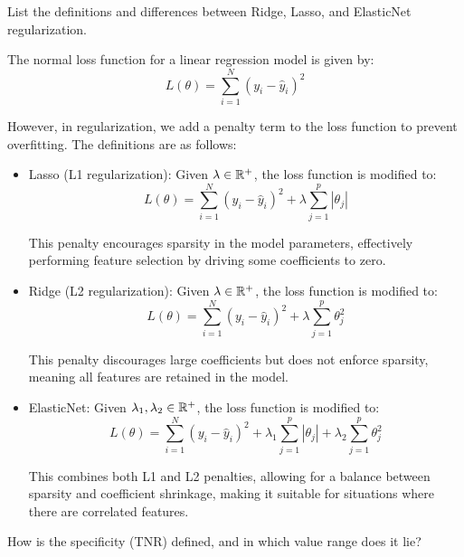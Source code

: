 \documentclass[12pt]{article}
\begin{document}
    \begin{ejercicio}
        List the definitions and differences between Ridge, Lasso, and ElasticNet regularization.

        The normal loss function for a linear regression model is given by:
        \[ L(\theta) = \sum_{i=1}^{N} (y_i - \hat{y}_i)^2 \]

        However, in regularization, we add a penalty term to the loss function to prevent overfitting. The definitions are as follows:
        \begin{itemize}
            \item Lasso (L1 regularization): Given $\lambda\in \mathbb{R}^+$, the loss function is modified to:
            \[ L(\theta) = \sum_{i=1}^{N} (y_i - \hat{y}_i)^2 + \lambda \sum_{j=1}^{p} |\theta_j| \]

            This penalty encourages sparsity in the model parameters, effectively performing feature selection by driving some coefficients to zero.

            \item Ridge (L2 regularization): Given $\lambda\in \mathbb{R}^+$, the loss function is modified to:
            \[ L(\theta) = \sum_{i=1}^{N} (y_i - \hat{y}_i)^2 + \lambda \sum_{j=1}^{p} \theta_j^2 \]

            This penalty discourages large coefficients but does not enforce sparsity, meaning all features are retained in the model.

            \item ElasticNet: Given $\lambda_1, \lambda_2\in \mathbb{R}^+$, the loss function is modified to:
            \[ L(\theta) = \sum_{i=1}^{N} (y_i - \hat{y}_i)^2 + \lambda_1 \sum_{j=1}^{p} |\theta_j| + \lambda_2 \sum_{j=1}^{p} \theta_j^2 \]

            This combines both L1 and L2 penalties, allowing for a balance between sparsity and coefficient shrinkage, making it suitable for situations where there are correlated features.
        \end{itemize}
    \end{ejercicio}

    \begin{ejercicio}[Specificity (1 pt.)]
        How is the specificity (TNR) defined, and in which value range does it lie?
    \end{ejercicio}
\end{document}
